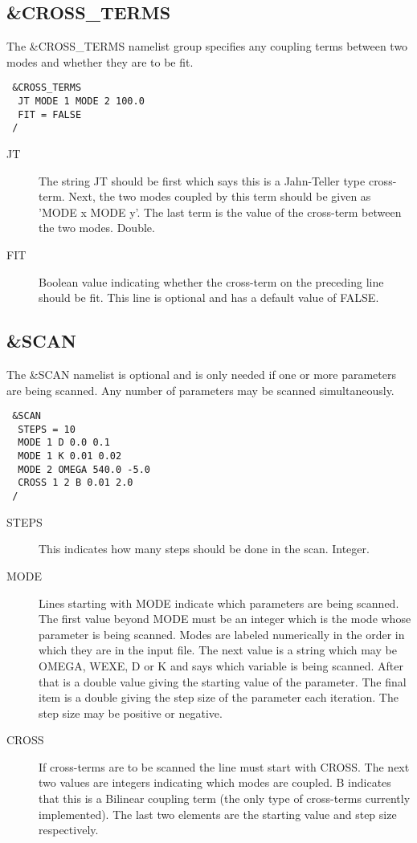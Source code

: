 \documentclass{article}
\begin{document}
\subsection{\&CROSS\_TERMS} The \&CROSS\_TERMS namelist group specifies
any coupling terms between two modes and whether they are to be fit.

\begin{verbatim}
 &CROSS_TERMS
  JT MODE 1 MODE 2 100.0
  FIT = FALSE
 /
\end{verbatim}

\begin{description}
\item[JT] The string JT should be first which says this is a Jahn-Teller type cross-term.
Next, the two modes coupled by this term should be given as 'MODE x MODE y'. 
The last term is the value of the cross-term between the two modes. Double.

\item[FIT] Boolean value indicating whether the cross-term on the preceding line
should be fit. This line is optional and has a default value of FALSE.

\end{description}

\subsection{\&SCAN} \label{scan}

The \&SCAN namelist is optional and is only needed if one or more parameters
are being scanned. Any number of parameters may be scanned simultaneously.

\begin{verbatim}
 &SCAN
  STEPS = 10
  MODE 1 D 0.0 0.1
  MODE 1 K 0.01 0.02
  MODE 2 OMEGA 540.0 -5.0
  CROSS 1 2 B 0.01 2.0
 /
\end{verbatim}

\begin{description}
\item[STEPS] This indicates how many steps should be done in the scan.
Integer.

\item[MODE] Lines starting with MODE indicate which parameters are being 
scanned. The first value beyond MODE must be an integer which is the mode
whose parameter is being scanned. Modes are labeled numerically in the order
in which they are in the input file. The next value is a string which may be
OMEGA, WEXE, D or K and says which variable is being scanned. After that 
is a double value giving the starting value of the parameter. The final
item is a double giving the step size of the parameter each iteration. 
The step size may be positive or negative.

\item[CROSS] If cross-terms are to be scanned the line must start with 
CROSS. The next two values are integers indicating which modes are coupled.
B indicates that this is a Bilinear coupling term (the only type
of cross-terms currently implemented). The last two elements are the starting
value and step size respectively.

\end{description}
\end{document}

